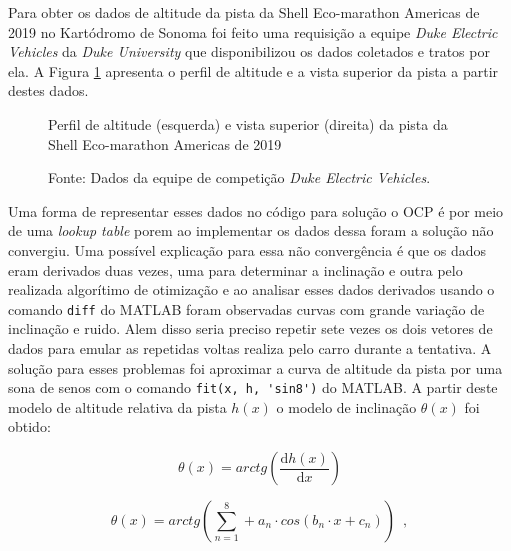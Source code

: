 Para obter os dados de altitude da pista da Shell Eco-marathon Americas de 2019 no Kartódromo de Sonoma foi feito uma requisição a equipe
\textit{Duke Electric Vehicles} da \textit{Duke University} que disponibilizou os dados coletados e tratos por ela. A Figura \ref{fig:altitude_pista} apresenta  
o perfil de altitude e a vista superior da pista a partir destes dados.

%     

\begin{figure}[h]
    \centering
    \caption{Perfil de altitude (esquerda) e vista superior (direita) da pista da Shell Eco-marathon Americas de 2019}
    
    \label{fig:altitude_pista}
    \caption*{\footnotesize{Fonte: Dados da equipe de competição \textit{Duke Electric Vehicles}.}}
\end{figure}

Uma forma de representar esses dados no código para solução o OCP é por meio de uma \textit{lookup table} porem ao implementar os dados dessa foram
a solução não convergiu. Uma possível explicação para essa não convergência é que os dados eram derivados duas vezes, uma para determinar a inclinação e outra pelo 
realizada algorítimo de otimização e ao analisar esses dados derivados usando o comando \lstinline[style=Matlab-editor]{diff} do MATLAB  foram observadas curvas
com grande variação de inclinação e ruido. Alem disso seria preciso repetir sete vezes os dois vetores de dados para emular as repetidas voltas realiza pelo carro durante a tentativa.
A solução para esses problemas foi aproximar a curva de altitude da pista por uma sona de senos com o comando \lstinline[style=Matlab-editor]{fit(x, h, 'sin8')} do MATLAB.  
A partir deste modelo de altitude relativa da pista $h(x)$ o modelo de inclinação $\theta(x)$ foi obtido:

\[ \theta(x) = arctg\left( \frac{\mathrm{d}h(x)}{\mathrm{d}x}  \right)  \]

\begin{equation}
	\label{eq:modeloTheta}
	\theta(x) = arctg \left( \sum_{n = 1}^{8} + a_n \cdot cos(b_n \cdot x + c_n) \right)
	\enspace,
\end{equation}

